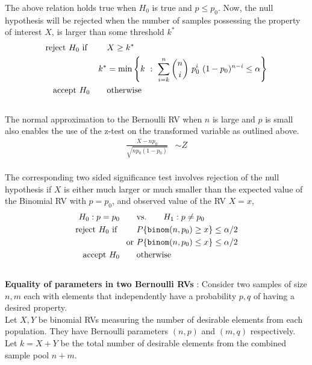 The above relation holds true when $ H_0 $ is true and $ p \leq p_0 $. Now, the null hypothesis will be rejected when the number of samples possessing the property of interest $ X $, is larger than some threshold $ k^* $\\

\begin{align}
	\text{reject $ H_0 $ if } \qquad & X \geq k^*  \nonumber \\
	k^* &= \min \left\{k\ :\ \sum\limits_{i=k}^{n} \binom{n}{i}\ p_0^i\ (1-p_0)^{n-i} \leq \alpha \right\} \nonumber \\
	\text{accept $ H_0 $} \qquad & \text{otherwise}
\end{align}\\

The normal approximation to the Bernoulli RV when $ n $ is large and $ p $ is small also enables the use of the z-test on the transformed variable as outlined above.\\

\begin{align}
	\frac{X - np_0}{\sqrt{np_0(1-p_0)}} &\sim Z \nonumber
\end{align}\\

The corresponding two sided significance test involves rejection of the null hypothesis if $ X $ is either much larger or much smaller than the expected value of the Binomial RV with $ p = p_0 $, and observed value of the RV $ X = x $,\\

\begin{align}
	H_0 : p  = p_0 \qquad &\text{vs.} \qquad H_1 : p  \neq p_0 \nonumber \\
	\text{reject $ H_0 $ if } \qquad & P\{\texttt{binom}(n, p_0) \geq x\} \leq \alpha/2  \nonumber \\
	\text{or }& P\{\texttt{binom}(n, p_0) \leq x\} \leq \alpha/2 \nonumber \\
	\text{accept $ H_0 $} \qquad & \text{otherwise}
\end{align}\\

\textbf{Equality of parameters in two Bernoulli RVs} : Consider two samples of size $ n, m $ each with elements that independently have a probability $ p, q $ of having a desired property.\\

Let $ X, Y $ be binomial RVs measuring the number of desirable elements from each population. They have Bernoulli parameters $ (n,p) $ and $ (m, q) $ respectively. Let $ k = X + Y $ be the total number of desirable elements from the combined sample pool $ n+m $.\\

